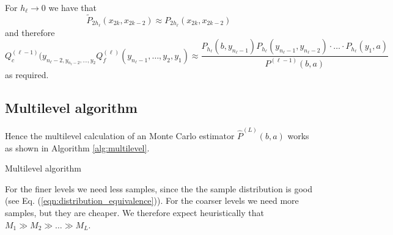 \documentclass{article}
\begin{document}
For $h_\ell\rightarrow 0$ we have that
\begin{equation}
\tilde{P}_{2h_\ell}(x_{2k},x_{2k-2})\approx P_{2h_\ell}(x_{2k},x_{2k-2})
\label{eqn:P_approx}
\end{equation}
and therefore
\begin{equation}
Q_c^{(\ell-1)}(y_{n_\ell-2,y_{n_\ell-2},\dots,y_2}Q_f^{(\ell)}(y_{n_\ell-1},\dots,y_2,y_1)
\approx 
\frac{P_{h_\ell}(b,y_{n_\ell-1})P_{h_\ell}(y_{n_\ell-1},y_{n_\ell-2})\cdot\dots\cdot P_{h_\ell}(y_1,a)}{P^{(\ell-1)}(b,a)}
\label{eqn:distribution_equivalence}
\end{equation}
as required.
\subsection{Multilevel algorithm}
Hence the multilevel calculation of an Monte Carlo estimator $\hat{P}^{(L)}(b,a)$ works as shown in Algorithm \ref{alg:multilevel}.
\begin{algorithm}
\begin{algorithmic}[1]
\ENDFOR
\end{algorithmic}
\caption{Multilevel algorithm}\label{alg:multilevel}
\end{algorithm}
For the finer levels we need less samples, since the the sample distribution is good (see Eq. (\ref{eqn:distribution_equivalence})). For the coarser levels we need more samples, but they are cheaper. We therefore expect heuristically that $M_1\gg M_2\gg\dots\gg M_L$.
\end{document}
